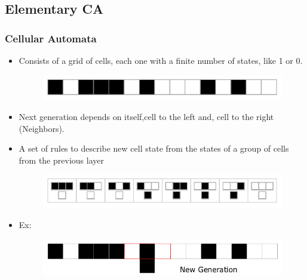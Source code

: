 \documentclass{beamer}
\begin{document}
\subsection{Elementary CA}
\begin{frame}
    \frametitle{Cellular Automata}
    \begin{itemize}
        \item Consists of a grid of cells, each one with a finite number of states, like 1 or 0.
        \begin{figure}
            \centering
            \includegraphics[scale=0.4]{grid.pdf}
        \end{figure}
        \item Next generation depends on itself,cell to the left and, cell to the right (Neighbors).
        \item A set of rules to describe new cell state from the states of a group of cells from the previous layer
        \begin{figure}[H]
            \includegraphics[scale=0.5]{rulerule30}
        \end{figure}
        \item Ex:
        \begin{figure}
            \centering
            \includegraphics[scale=0.4]{IMG.png}
        \end{figure}
    \end{itemize}
\end{frame}
\end{document}
